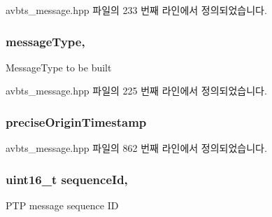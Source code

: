 avbts\+\_\+message.\+hpp 파일의 233 번째 라인에서 정의되었습니다.

\subsubsection[{\texorpdfstring{message\+Type}{messageType}}]{ message\+Type\hspace{0.3cm}{\ttfamily [protected]}, {\ttfamily [inherited]}}\hypertarget{class_p_t_p_message_common_adb32627aa5b0e2dbad3ccd88aab07c05}{}\label{class_p_t_p_message_common_adb32627aa5b0e2dbad3ccd88aab07c05}
Message\+Type to be built 

avbts\+\_\+message.\+hpp 파일의 225 번째 라인에서 정의되었습니다.

\subsubsection[{\texorpdfstring{precise\+Origin\+Timestamp}{preciseOriginTimestamp}}]{ precise\+Origin\+Timestamp\hspace{0.3cm}{\ttfamily [private]}}\hypertarget{class_p_t_p_message_follow_up_ab410646215c0bcbaf124d5923f22e2ca}{}\label{class_p_t_p_message_follow_up_ab410646215c0bcbaf124d5923f22e2ca}


avbts\+\_\+message.\+hpp 파일의 862 번째 라인에서 정의되었습니다.

\subsubsection[{\texorpdfstring{sequence\+Id}{sequenceId}}]{\setlength{\rightskip}{0pt plus 5cm}uint16\+\_\+t sequence\+Id\hspace{0.3cm}{\ttfamily [protected]}, {\ttfamily [inherited]}}\hypertarget{class_p_t_p_message_common_a189710d5cff10c03f77d72a276a5f58e}{}\label{class_p_t_p_message_common_a189710d5cff10c03f77d72a276a5f58e}
P\+TP message sequence ID 


